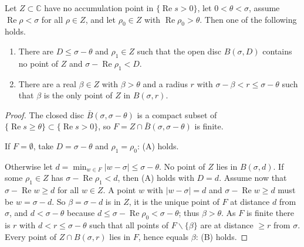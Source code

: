 \begin{lemma}\label{lem:E-dichotomy}

\par{}\par
Let $Z\subset\mathbb C$ have no accumulation point in $\{\operatorname{Re}s>0\}$, let
$0<\theta<\sigma$, assume $\operatorname{Re}\rho<\sigma$ for all $\rho\in Z$, and let
$\rho_0\in Z$ with $\operatorname{Re}\rho_0>\theta$. Then one of the following holds.
\begin{enumerate}
\item[(A)] There are $D\le\sigma-\theta$ and $\rho_1\in Z$ such that the open disc
$B(\sigma,D)$ contains no point of $Z$ and $\sigma-\operatorname{Re}\rho_1<D$.
\item[(B)] There are a real $\beta\in Z$ with $\beta>\theta$ and a radius $r$ with
$\sigma-\beta<r\le\sigma-\theta$ such that $\beta$ is the only point of $Z$ in $B(\sigma,r)$.
\end{enumerate}
\end{lemma}
\begin{proof}
The closed disc $\bar B(\sigma,\sigma-\theta)$ is a compact subset of
$\{\operatorname{Re}s\ge\theta\}\subset\{\operatorname{Re}s>0\}$, so
$F=Z\cap\bar B(\sigma,\sigma-\theta)$ is finite.

If $F=\emptyset$, take $D=\sigma-\theta$ and $\rho_1=\rho_0$: (A) holds.

Otherwise let $d=\min_{w\in F}|w-\sigma|\le\sigma-\theta$. No point of $Z$ lies in $B(\sigma,d)$. If
some $\rho_1\in Z$ has $\sigma-\operatorname{Re}\rho_1<d$, then (A) holds with $D=d$. Assume now
that $\sigma-\operatorname{Re}w\ge d$ for all $w\in Z$. A point $w$ with $|w-\sigma|=d$ and
$\sigma-\operatorname{Re}w\ge d$ must be $w=\sigma-d$. So $\beta=\sigma-d$ is in $Z$, it is the
unique point of $F$ at distance $d$ from $\sigma$, and $d<\sigma-\theta$ because
$d\le\sigma-\operatorname{Re}\rho_0<\sigma-\theta$; thus $\beta>\theta$. As $F$ is finite there is
$r$ with $d<r\le\sigma-\theta$ such that all points of $F\smallsetminus\{\beta\}$ are at distance
$\ge r$ from $\sigma$. Every point of $Z\cap B(\sigma,r)$ lies in $F$, hence equals $\beta$: (B)
holds.

\end{proof}

